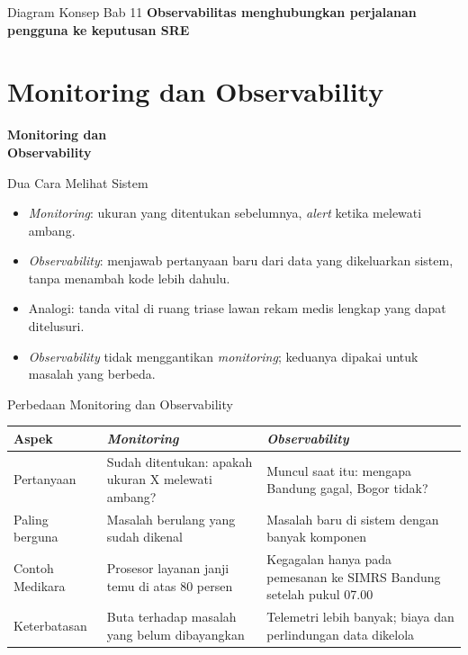 \documentclass[aspectratio=169, table, 12pt]{beamer}
\begin{document}
\begin{frame}{{\Large Diagram Konsep Bab 11}}
  \centering
  {\small\bfseries Observabilitas menghubungkan perjalanan pengguna ke keputusan SRE}\par\medskip
\end{frame}

\section{Monitoring dan Observability}

\begin{frame}{\hfill}
  \centering
  \Huge{\textbf{Monitoring dan\\Observability}}
\end{frame}

\begin{frame}{{\Large Dua Cara Melihat Sistem}}
  \vspace{10pt}
  \begin{itemize}
    \item \textit{Monitoring}: ukuran yang ditentukan sebelumnya, \textit{alert} ketika
          melewati ambang.
    \item \textit{Observability}: menjawab pertanyaan baru dari data yang dikeluarkan
          sistem, tanpa menambah kode lebih dahulu.
    \item Analogi: tanda vital di ruang triase lawan rekam medis lengkap yang dapat
          ditelusuri.
    \item \textit{Observability} tidak menggantikan \textit{monitoring}; keduanya
          dipakai untuk masalah yang berbeda.
  \end{itemize}
\end{frame}

\begin{frame}{{\Large Perbedaan Monitoring dan Observability}}
  \footnotesize
  \begin{tabularx}{\textwidth}{>{\raggedright\arraybackslash}p{2.6cm}
      >{\raggedright\arraybackslash}X >{\raggedright\arraybackslash}X}
    \hline
    \textbf{Aspek} & \textbf{\textit{Monitoring}} & \textbf{\textit{Observability}} \\
    \hline
    Pertanyaan & Sudah ditentukan: apakah ukuran X melewati ambang? & Muncul saat itu:
      mengapa Bandung gagal, Bogor tidak? \\
    \hline
    Paling berguna & Masalah berulang yang sudah dikenal & Masalah baru di sistem dengan
      banyak komponen \\
    \hline
    Contoh Medikara & Prosesor layanan janji temu di atas 80 persen & Kegagalan hanya
      pada pemesanan ke SIMRS Bandung setelah pukul 07.00 \\
    \hline
    Keterbatasan & Buta terhadap masalah yang belum dibayangkan & Telemetri lebih banyak;
      biaya dan perlindungan data dikelola \\
    \hline
  \end{tabularx}
\end{frame}
\end{document}

